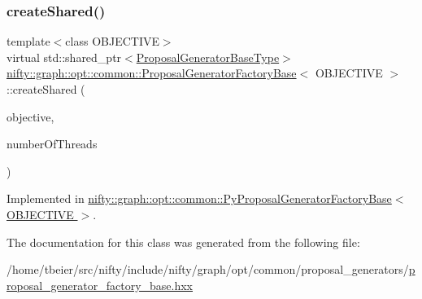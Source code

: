 \subsubsection{\texorpdfstring{create\+Shared()}{createShared()}}
{\footnotesize\ttfamily template$<$class O\+B\+J\+E\+C\+T\+I\+VE$>$ \\
virtual std\+::shared\+\_\+ptr$<$\hyperlink{classnifty_1_1graph_1_1opt_1_1common_1_1ProposalGeneratorFactoryBase_a262cfc7056a43871e15130dd4435dee7}{Proposal\+Generator\+Base\+Type}$>$ \hyperlink{classnifty_1_1graph_1_1opt_1_1common_1_1ProposalGeneratorFactoryBase}{nifty\+::graph\+::opt\+::common\+::\+Proposal\+Generator\+Factory\+Base}$<$ O\+B\+J\+E\+C\+T\+I\+VE $>$\+::create\+Shared (\begin{DoxyParamCaption}\item[{const \hyperlink{classnifty_1_1graph_1_1opt_1_1common_1_1ProposalGeneratorFactoryBase_abb308b47da6f89126f786b394be0efc5}{Objective\+Type} \&}]{objective,  }\item[{const size\+\_\+t}]{number\+Of\+Threads }\end{DoxyParamCaption})\hspace{0.3cm}{\ttfamily [pure virtual]}}



Implemented in \hyperlink{classnifty_1_1graph_1_1opt_1_1common_1_1PyProposalGeneratorFactoryBase_a1e028a4615370fd13ed5eb9b3bb822a0}{nifty\+::graph\+::opt\+::common\+::\+Py\+Proposal\+Generator\+Factory\+Base$<$ O\+B\+J\+E\+C\+T\+I\+V\+E $>$}.



The documentation for this class was generated from the following file\+:\begin{DoxyCompactItemize}
\item 
/home/tbeier/src/nifty/include/nifty/graph/opt/common/proposal\+\_\+generators/\hyperlink{common_2proposal__generators_2proposal__generator__factory__base_8hxx}{proposal\+\_\+generator\+\_\+factory\+\_\+base.\+hxx}\end{DoxyCompactItemize}
